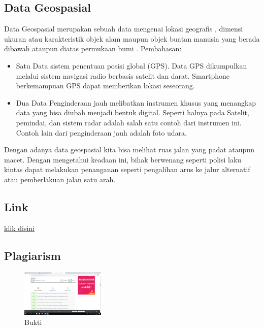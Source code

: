 \subsection{Data Geospasial}
Data Geospasial merupakan sebuah data mengenai lokasi geografis , dimensi ukuran atau karakteristik objek alam maupun objek buatan manusia yang berada dibawah ataupun diatas permukaan bumi . Pembahasan:
\begin{itemize}
	\item Satu
	Data sistem penentuan posisi global (GPS). Data GPS dikumpulkan melalui sistem navigasi radio berbasis satelit dan darat. Smartphone berkemampuan GPS dapat memberikan lokasi seseorang.

	\item Dua
	Data Penginderaan jauh melibatkan instrumen khusus yang menangkap data yang bisa diubah menjadi bentuk digital. Seperti halnya pada Satelit, pemindai, dan sistem radar adalah salah satu  contoh dari instrumen ini. Contoh lain dari penginderaan jauh adalah foto udara.

\end{itemize}
Dengan adanya data geospasial kita bisa melihat ruas jalan yang padat ataupun macet. Dengan mengetahui keadaan ini, bihak berwenang seperti polisi laku kintas dapat melakukan penanganan seperti pengalihan arus ke jalur alternatif atau pemberlakuan jalan satu arah.  

\subsection{Link}
\href {https://youtu.be/3P1zRqXBvx4}{klik disini}
\subsection{Plagiarism}
\begin{figure}[H]
	\includegraphics[width=4cm]{figures/1174012/gb.png}
	\centering
	\caption{Bukti}
\end{figure}
